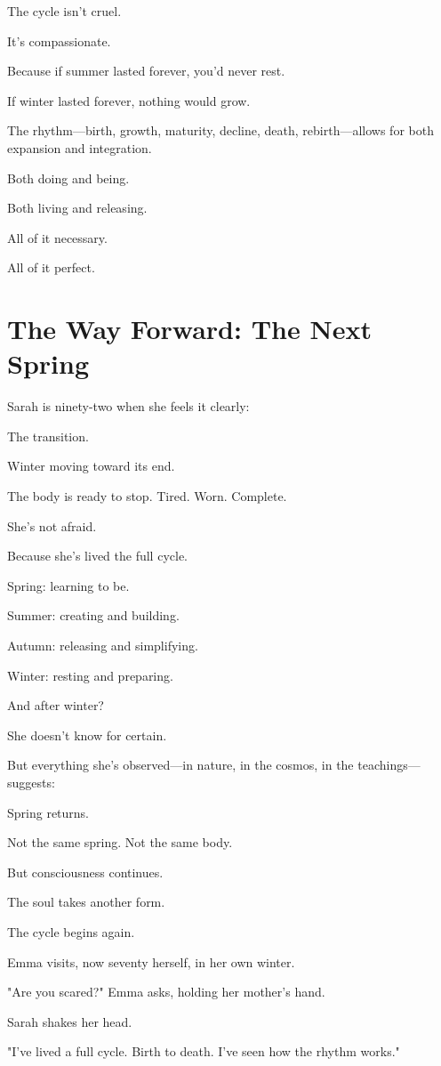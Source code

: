 \documentclass[11pt,twoside]{book}
\begin{document}
The cycle isn't cruel.

It's compassionate.

Because if summer lasted forever, you'd never rest.

If winter lasted forever, nothing would grow.

The rhythm—birth, growth, maturity, decline, death, rebirth—allows for both expansion and integration.

Both doing and being.

Both living and releasing.

All of it necessary.

All of it perfect.

\section*{The Way Forward: The Next Spring}

Sarah is ninety-two when she feels it clearly:

The transition.

Winter moving toward its end.

The body is ready to stop. Tired. Worn. Complete.

She's not afraid.

Because she's lived the full cycle.

Spring: learning to be.

Summer: creating and building.

Autumn: releasing and simplifying.

Winter: resting and preparing.

And after winter?

She doesn't know for certain.

But everything she's observed—in nature, in the cosmos, in the teachings—suggests:

Spring returns.

Not the same spring. Not the same body.

But consciousness continues.

The soul takes another form.

The cycle begins again.

Emma visits, now seventy herself, in her own winter.

"Are you scared?" Emma asks, holding her mother's hand.

Sarah shakes her head.

"I've lived a full cycle. Birth to death. I've seen how the rhythm works."
\end{document}
